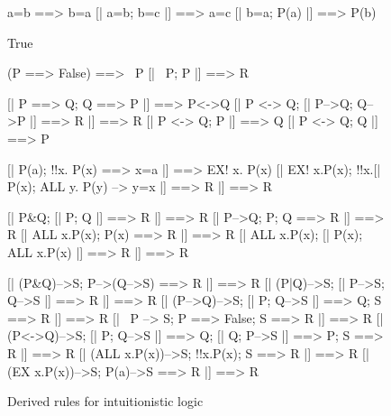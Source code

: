 \begin{figure} 
\begin{ttbox}
       a=b ==> b=a
     [| a=b;  b=c |] ==> a=c
    [| b=a;  P(a) |] ==> P(b)

     True

      (P ==> False) ==> ~P
      [| ~P;  P |] ==> R

      [| P ==> Q;  Q ==> P |] ==> P<->Q
      [| P <-> Q;  [| P-->Q; Q-->P |] ==> R |] ==> R
     [| P <-> Q;  P |] ==> Q            
     [| P <-> Q;  Q |] ==> P

      [| P(a);  !!x. P(x) ==> x=a |]  ==>  EX! x. P(x)
      [| EX! x.P(x);  !!x.[| P(x);  ALL y. P(y) --> y=x |] ==> R 
          |] ==> R

     [| P&Q;  [| P; Q |] ==> R |] ==> R
      [| P-->Q;  P;  Q ==> R |] ==> R
      [| ALL x.P(x);  P(x) ==> R |] ==> R
  [| ALL x.P(x);  [| P(x); ALL x.P(x) |] ==> R |] ==> R

 [| (P&Q)-->S;  P-->(Q-->S) ==> R |] ==> R
 [| (P|Q)-->S;  [| P-->S; Q-->S |] ==> R |] ==> R
  [| (P-->Q)-->S;  [| P; Q-->S |] ==> Q;  S ==> R |] ==> R
  [| ~P --> S;  P ==> False;  S ==> R |] ==> R
  [| (P<->Q)-->S; [| P; Q-->S |] ==> Q; [| Q; P-->S |] ==> P;
             S ==> R |] ==> R
  [| (ALL x.P(x))-->S;  !!x.P(x);  S ==> R |] ==> R
   [| (EX x.P(x))-->S;  P(a)-->S ==> R |] ==> R
\end{ttbox}
\caption{Derived rules for intuitionistic logic} \label{fol-int-derived}
\end{figure}


